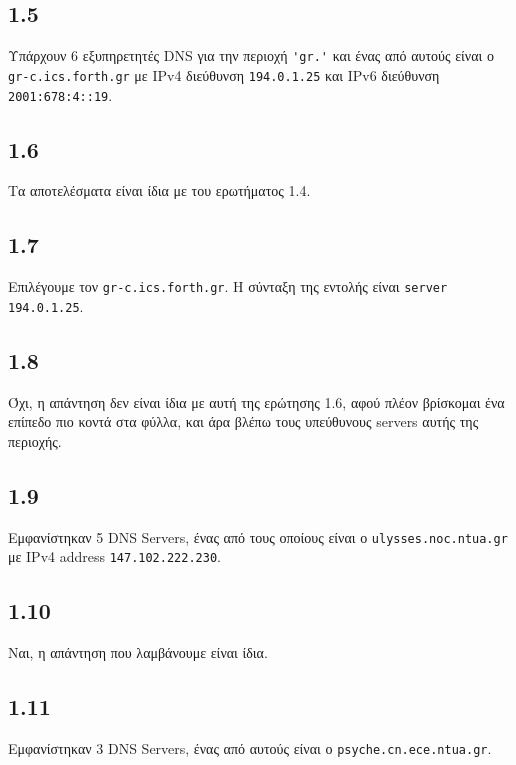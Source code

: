 		\subsection*{1.5} 
			Υπάρχουν 6 εξυπηρετητές DNS για την περιοχή \verb|'gr.'| και ένας από αυτούς είναι ο \verb|gr-c.ics.forth.gr| με IPv4 διεύθυνση \verb|194.0.1.25| και IPv6 διεύθυνση \verb|2001:678:4::19|.

		\subsection*{1.6} 
			Τα αποτελέσματα είναι ίδια με του ερωτήματος 1.4.

		\subsection*{1.7} 
			Επιλέγουμε τον \verb|gr-c.ics.forth.gr|. Η σύνταξη της εντολής είναι \verb|server 194.0.1.25|.

		\subsection*{1.8} 
			Όχι, η απάντηση δεν είναι ίδια με αυτή της ερώτησης 1.6, αφού πλέον βρίσκομαι ένα επίπεδο πιο κοντά στα φύλλα, και άρα βλέπω τους υπεύθυνους servers αυτής της περιοχής.

		\subsection*{1.9} 
			Εμφανίστηκαν 5 DNS Servers, ένας από τους οποίους είναι ο \verb|ulysses.noc.ntua.gr| με IPv4 address \verb|147.102.222.230|.
		
		\subsection*{1.10} 
			Ναι, η απάντηση που λαμβάνουμε είναι ίδια. 

		\subsection*{1.11} 
			Εμφανίστηκαν 3 DNS Servers, ένας από αυτούς είναι ο \verb|psyche.cn.ece.ntua.gr|.

